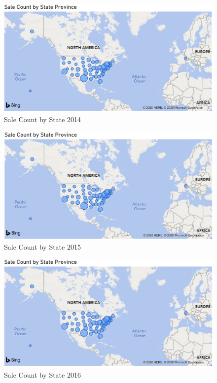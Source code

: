 \documentclass[12pt]{article}
\begin{document}
\begin{figure}[H]
    \centering
    \includegraphics [width=17.5cm]
    {images/Sales/Sale Count by State Province2014.png}
    \caption{Sale Count by State 2014}
    \label{Sale Count by State 2014}
\end{figure}

\begin{figure}[H]
    \centering
    \includegraphics [width=17.5cm]
    {images/Sales/Sale Count by State Province2015.png}
    \caption{Sale Count by State 2015}
    \label{Sale Count by State 2015}
\end{figure}

\begin{figure}[H]
    \centering
    \includegraphics [width=17.5cm]
    {images/Sales/Sale Count by State Province2016.png}
    \caption{Sale Count by State 2016}
    \label{Sale Count by State 2016}
\end{figure}
\end{document}
